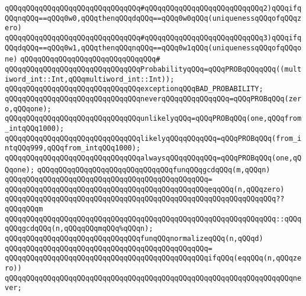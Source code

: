 \verb|qQQqqQQqqQQqqQQqqQQqqQQqqQQqqQQq#qQQqqQQqqQQqqQQqqQQqqQQqqQQq2)qQQqifqQQqnqQQq==qQQq0w0,qQQqthenqQQqdqQQq==qQQq0w0qQQq(uniquenessqQQqofqQQqzero)|\newline
\verb|qQQqqQQqqQQqqQQqqQQqqQQqqQQqqQQq#qQQqqQQqqQQqqQQqqQQqqQQqqQQq3)qQQqifqQQqdqQQq==qQQq0w1,qQQqthenqQQqnqQQq==qQQq0w1qQQq(uniquenessqQQqofqQQqone)|\newline
\verb|qQQqqQQqqQQqqQQqqQQqqQQqqQQqqQQq#|\newline
\verb|qQQqqQQqqQQqqQQqqQQqqQQqqQQqqQQqProbabilityqQQq=qQQqPROBqQQqqQQq((multiword_int::Int,qQQqmultiword_int::Int));|\newline
\newline
\verb|qQQqqQQqqQQqqQQqqQQqqQQqqQQqqQQqexceptionqQQqBAD_PROBABILITY;|\newline
\newline
\verb|qQQqqQQqqQQqqQQqqQQqqQQqqQQqqQQqneverqQQqqQQqqQQqqQQq=qQQqPROBqQQq(zero,qQQqone);|\newline
\verb|qQQqqQQqqQQqqQQqqQQqqQQqqQQqqQQqunlikelyqQQq=qQQqPROBqQQq(one,qQQqfrom_intqQQq1000);|\newline
\verb|qQQqqQQqqQQqqQQqqQQqqQQqqQQqqQQqlikelyqQQqqQQqqQQq=qQQqPROBqQQq(from_intqQQq999,qQQqfrom_intqQQq1000);|\newline
\verb|qQQqqQQqqQQqqQQqqQQqqQQqqQQqqQQqalwaysqQQqqQQqqQQq=qQQqPROBqQQq(one,qQQqone);|\newline
\newline
\verb|qQQqqQQqqQQqqQQqqQQqqQQqqQQqqQQqfunqQQqgcdqQQq(m,qQQqn)|\newline
\verb|qQQqqQQqqQQqqQQqqQQqqQQqqQQqqQQqqQQqqQQqqQQqqQQq=|\newline
\verb|qQQqqQQqqQQqqQQqqQQqqQQqqQQqqQQqqQQqqQQqqQQqqQQqeqqQQq(n,qQQqzero)|\newline
\verb|qQQqqQQqqQQqqQQqqQQqqQQqqQQqqQQqqQQqqQQqqQQqqQQqqQQqqQQqqQQqqQQq??qQQqqQQqm|\newline
\verb|qQQqqQQqqQQqqQQqqQQqqQQqqQQqqQQqqQQqqQQqqQQqqQQqqQQqqQQqqQQqqQQq::qQQqqQQqgcdqQQq(n,qQQqqQQqmqQQq%qQQqn);|\newline
\newline
\verb|qQQqqQQqqQQqqQQqqQQqqQQqqQQqqQQqfunqQQqnormalizeqQQq(n,qQQqd)|\newline
\verb|qQQqqQQqqQQqqQQqqQQqqQQqqQQqqQQqqQQqqQQqqQQqqQQq=|\newline
\verb|qQQqqQQqqQQqqQQqqQQqqQQqqQQqqQQqqQQqqQQqqQQqqQQqifqQQq(eqqQQq(n,qQQqzero))|\newline
\newline
\verb|qQQqqQQqqQQqqQQqqQQqqQQqqQQqqQQqqQQqqQQqqQQqqQQqqQQqqQQqqQQqqQQqqQQqnever;|\newline
